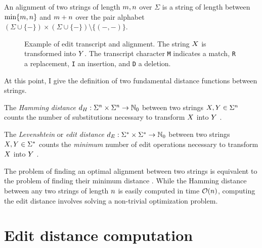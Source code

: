 \begin{definition}[Alignment]
\label{def:alignment}
An alignment of two strings of length $m,n$ over $\Sigma$ is a string of length between $\text{min}\{m,n\}$ and $m+n$ over the pair alphabet $(\Sigma \cup \{ - \}) \times (\Sigma \cup \{ - \}) \setminus \{ (-,-) \} $.
\end{definition}

\begin{figure}[h]
\begin{center}
\caption[Example of edit transcript and alignment]{Example of edit transcript and alignment. The string $X$ is transformed into $Y$. The transcript character \texttt{M} indicates a match, \texttt{R} a replacement, \texttt{I} an insertion, and \texttt{D} a deletion.
}
\label{fig:edit-transcript}

\end{center}
\end{figure}

At this point, I give the definition of two fundamental distance functions between strings.

\begin{definition}
\label{def:hamming}
The \emph{Hamming distance} $d_H : \Sigma^{n} \times \Sigma^{n} \rightarrow \mathbb {N}_0$ between two strings $X,Y \in \Sigma^{n}$ counts the number of substitutions necessary to transform $X$ into $Y$ \citep{Hamming1950}.
\end{definition}

\begin{definition}
\label{def:edit}
The \emph{Levenshtein} or \emph{edit distance} $d_E : \Sigma^{*} \times \Sigma^{*} \rightarrow \mathbb {N}_0$ between two strings $X,Y \in \Sigma^{*}$ counts the \emph{minimum} number of edit operations necessary to transform $X$ into $Y$ \citep{Levenshtein1966}.
\end{definition}

The problem of finding an optimal alignment between two strings is equivalent to the problem of finding their minimum distance \citep{Gusfield1997}.
While the Hamming distance between any two strings of length $n$ is easily computed in time $\mathcal{O}(n)$, computing the edit distance involves solving a non-trivial optimization problem.

\section{Edit distance computation}

